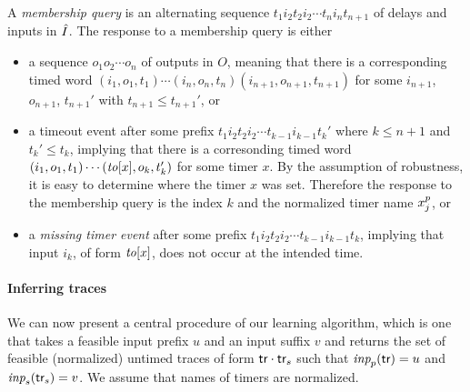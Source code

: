 A {\em membership query} is an alternating sequence
$t_1i_2t_2i_2 \cdots t_ni_nt_{n+1}$ of delays and inputs in $\hat{I}$.
The response to a membership query is either
\begin{itemize}
\item
  a sequence $o_1 o_2 \cdots o_n$ of outputs in $O$, meaning that there is
  a corresponding timed word $(i_1, o_1, t_1) \cdots (i_n, o_n, t_n)(i_{n+1}, o_{n+1}, t_{n+1})$ for some $i_{n+1}$, $o_{n+1}$, $t_{n+1}'$ with $t_{n+1} \leq t_{n+1}'$,
  or
\item
  a timeout event after some prefix $t_1i_2t_2i_2 \cdots t_{k-1}i_{k-1}t_{k}'$
  where $k \leq n+1$ and $t_k' \leq t_k$, implying that  there is
  a corresonding timed word $(i_1, o_1, t_1) \cdots (\mathit{to}[x], o_k, t_k')$
  for some timer $x$. By the assumption of robustness, it is easy to
  determine where the timer $x$ was set. Therefore the response to the
  membership query is the index $k$ and the normalized timer name
  $x_{j}^{p}$, or
\item
  a {\em missing timer event} after some prefix
  $t_1i_2t_2i_2 \cdots t_{k-1}i_{k-1}t_{k}$, implying that input $i_k$, of
  form $\mathit{to}[x]$, does not occur at the intended time.
\end{itemize}

\paragraph{Inferring traces}
We can now present a central procedure of our learning algorithm,
which is one that 
takes a feasible input prefix $u$ and an input suffix $v$ and returns the set of
feasible (normalized) untimed traces of form $\textsf{tr}\cdot\textsf{tr}_s$ such that
$\textit{inp}_p(\textsf{tr}) = u$ and $\textit{inp}_s(\textsf{tr}_s) = v$.
We assume that names of timers are normalized.



